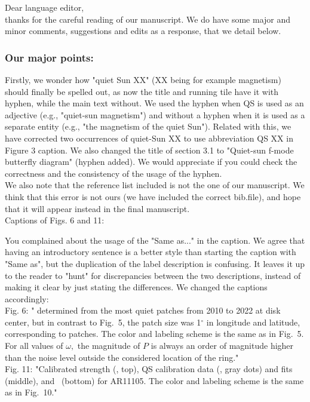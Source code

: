 \documentclass[a4]{article}
\begin{document}
\noindent Dear language editor,\\

\noindent thanks for the careful reading of our manuscript. We do have some major and minor comments, suggestions and edits as a response, that we detail below.\\

\subsubsection*{Our major points:}

\noindent Firstly, we wonder how "quiet Sun XX" (XX being for example magnetism) should finally be spelled out, as now the title and running tile have it with hyphen, while the main text without. We used the hyphen when QS is used as an adjective (e.g., "quiet-sun magnetism") and without a hyphen when it is used as a separate entity (e.g., "the magnetism of the quiet Sun").
Related with this, we have corrected two occurrences of quiet-Sun XX to use abbreviation QS XX in Figure 3 caption. 
We also changed the title of section 3.1 to "Quiet-sun f-mode butterfly diagram" (hyphen added).
We would appreciate if you could check the correctness and the consistency of the usage of the hyphen.\\

\noindent We also note that the reference list included is not the one of our manuscript. We think that this error is not ours (we have included the correct bib.file), and hope that it will appear instead in the final manuscript.\\

\noindent Captions of Figs. 6 and 11:

\noindent You complained about the usage of the "Same as..." in the caption. We agree that having an introductory sentence is a better style than starting the caption with "Same as", but the duplication of the label description is confusing. It leaves it up to the reader to "hunt" for discrepancies between the two descriptions, instead of making it clear by just stating the differences. We changed the captions accordingly: \\
Fig. 6: "\brms{} determined from the most quiet patches from 2010 to 
2022 at disk center, but in contrast to Fig.~5, the patch size was 1$^\circ$ in longitude and latitude, corresponding to \IN{} patches. The color and labeling scheme is the same as in Fig.~5. For all values of $\omega,$ the magnitude of $P$ is always an order of magnitude higher than the noise level outside the considered location of the ring."\\
Fig. 11: "Calibrated \fff strength (\eft, top), QS calibration data (\ef, gray dots) and fits (middle), and \brms\ (bottom) for AR11105. The color and labeling scheme is the same as in Fig.~10."
\end{document}

